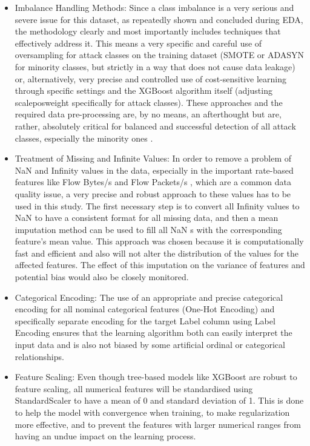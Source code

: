 \begin{itemize}[noitemsep] 
\item Imbalance Handling Methods: Since a class imbalance is a very serious and severe issue for this dataset, as repeatedly shown and concluded during EDA, the methodology clearly and most importantly includes techniques that effectively address it. This means a very specific and careful use of oversampling for attack classes on the training dataset (SMOTE or ADASYN for minority classes, but strictly in a way that does not cause data leakage) or, alternatively, very precise and controlled use of cost-sensitive learning through specific settings and the XGBoost algorithm itself (adjusting scale\textunderscore pos\textunderscore weight specifically for attack classes). These approaches and the required data pre-processing are, by no means, an afterthought but are, rather, absolutely critical for balanced and successful detection of all attack classes, especially the minority ones \parencite{mahfouz2022systematic}.
\item Treatment of Missing and Infinite Values: In order to remove a problem of NaN and Infinity values in the data, especially in the important rate-based features like Flow Bytes/s and Flow Packets/s , which are a common data quality issue, a very precise and robust approach to these values has to be used in this study. The first necessary step is to convert all Infinity values to NaN to have a consistent format for all missing data, and then a mean imputation method can be used to fill all NaN s with the corresponding feature's mean value. This approach was chosen because it is computationally fast and efficient and also will not alter the distribution of the values for the affected features. The effect of this imputation on the variance of features and potential bias would also be closely monitored.
\item Categorical Encoding: The use of an appropriate and precise categorical encoding for all nominal categorical features (One-Hot Encoding) and specifically separate encoding for the target Label column using Label Encoding ensures that the learning algorithm both can easily interpret the input data and is also not biased by some artificial ordinal or categorical relationships.
\item Feature Scaling: Even though tree-based models like XGBoost are robust to feature scaling, all numerical features will be standardised using StandardScaler to have a mean of 0 and standard deviation of 1. This is done to help the model with convergence when training, to make regularization more effective, and to prevent the features with larger numerical ranges from having an undue impact on the learning process.

\end{itemize}
